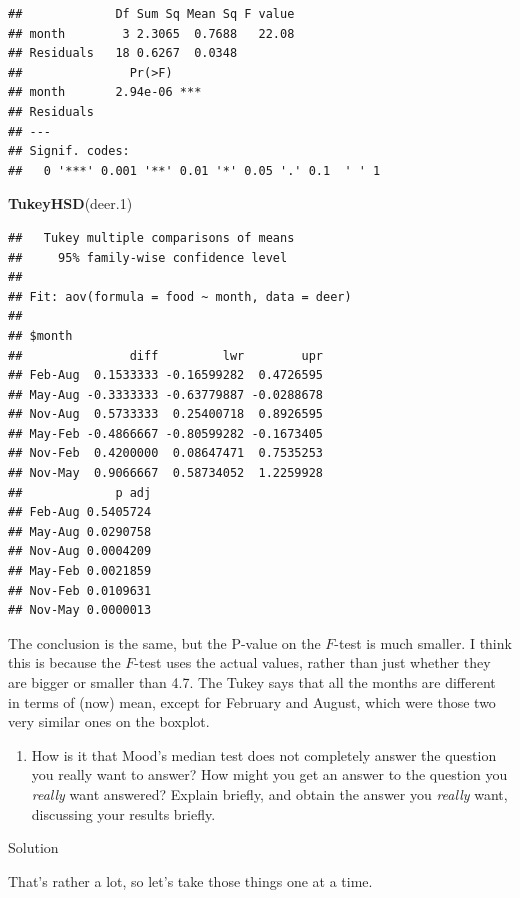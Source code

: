 \documentclass[]{tufte-book}
\newenvironment{Shaded}{}{}
\newcommand{\FloatTok}[1]{\textcolor[rgb]{0.25,0.63,0.44}{#1}}
\newcommand{\KeywordTok}[1]{\textcolor[rgb]{0.00,0.44,0.13}{\textbf{#1}}}
\newcommand{\NormalTok}[1]{#1}
\providecommand{\tightlist}{%
  \setlength{\itemsep}{0pt}\setlength{\parskip}{0pt}}
\theoremstyle{definition}
\theoremstyle{definition}
\theoremstyle{definition}
\theoremstyle{remark}
\begin{document}
\begin{verbatim}
##             Df Sum Sq Mean Sq F value
## month        3 2.3065  0.7688   22.08
## Residuals   18 0.6267  0.0348        
##               Pr(>F)    
## month       2.94e-06 ***
## Residuals               
## ---
## Signif. codes:  
##   0 '***' 0.001 '**' 0.01 '*' 0.05 '.' 0.1  ' ' 1
\end{verbatim}

\begin{Shaded}
\begin{Highlighting}[]
\KeywordTok{TukeyHSD}\NormalTok{(deer}\FloatTok{.1}\NormalTok{)}
\end{Highlighting}
\end{Shaded}

\begin{verbatim}
##   Tukey multiple comparisons of means
##     95% family-wise confidence level
## 
## Fit: aov(formula = food ~ month, data = deer)
## 
## $month
##               diff         lwr        upr
## Feb-Aug  0.1533333 -0.16599282  0.4726595
## May-Aug -0.3333333 -0.63779887 -0.0288678
## Nov-Aug  0.5733333  0.25400718  0.8926595
## May-Feb -0.4866667 -0.80599282 -0.1673405
## Nov-Feb  0.4200000  0.08647471  0.7535253
## Nov-May  0.9066667  0.58734052  1.2259928
##             p adj
## Feb-Aug 0.5405724
## May-Aug 0.0290758
## Nov-Aug 0.0004209
## May-Feb 0.0021859
## Nov-Feb 0.0109631
## Nov-May 0.0000013
\end{verbatim}

The conclusion is the same, but the P-value on the \(F\)-test is much
smaller. I think this is because the \(F\)-test uses the actual values,
rather than just whether they are bigger or smaller than 4.7. The Tukey
says that all the months are different in terms of (now) mean, except
for February and August, which were those two very similar ones on the
boxplot.

\begin{enumerate}
\def\labelenumi{(\alph{enumi})}
\setcounter{enumi}{4}
\tightlist
\item
  How is it that Mood's median test does not completely answer the
  question you really want to answer? How might you get an answer to the
  question you \emph{really} want answered? Explain briefly, and obtain
  the answer you \emph{really} want, discussing your results briefly.
\end{enumerate}

Solution

That's rather a lot, so let's take those things one at a time.
\end{document}
